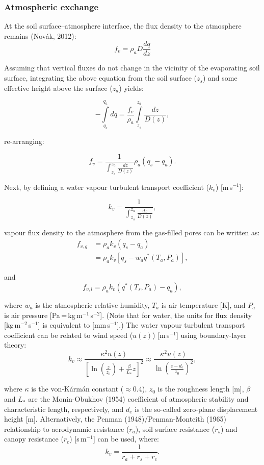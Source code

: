 \documentclass[10pt, letterpapr]{article}
\begin{document}
\subsubsection*{Atmospheric exchange}

At the soil surface--atmosphere interface, the flux density to the atmosphere remains (Nov\'ak, 2012):
\[
	f_v=\rho_a D \frac{dq}{dz}
\]

Assuming that vertical fluxes do not change in the vicinity of the evaporating soil surface, integrating the above equation from the soil surface ($z_s$) and some effective height above the surface ($z_a$) yields: %

\[
	-\int\limits_{q_s}^{q_a}dq = \frac{f_v}{\rho_a}\int\limits_{z_s}^{z_a}\frac{dz}{D(z)},
\]

\noindent re-arranging:

\[
	f_v=\frac{1}{\int_{z_s}^{z_a}\frac{dz}{D(z)}}\rho_a(q_s-q_a).
\]

\noindent Next, by defining a water vapour turbulent transport coefficient ($k_v$) [m\,s$^{-1}$]:

\[
	k_v=\frac{1}{\int_{z_s}^{z_a}\frac{dz}{D(z)}},
\]

\noindent vapour flux density to the atmosphere from the gas-filled pores can be written as:
\begin{align*}
	f_{v,g} &=\rho_ak_v(q_s-q_a) \\
	&=\rho_ak_v\left[q_s-w_aq^*(T_a,P_a)\right],
\end{align*}

\noindent and
\[
	f_{v,l}=\rho_ak_v(q^*(T_s,P_a)-q_a),
\]

\noindent where $w_a$ is the atmospheric relative humidity, $T_a$ is air temperature [K], and $P_a$ is air pressure [Pa\,=\,kg\,m$^{-1}$\,s$^{-2}$]. (Note that for water, the units for flux density [kg\,m$^{-2}$\,s$^{-1}$] is equivalent to [mm\,s$^{-1}$].) The water vapour turbulent transport coefficient can be related to wind speed ($u(z)$) [m\,s$^{-1}$] using boundary-layer theory: %
\[
	k_v\approx\frac{\kappa^2u(z)}{\left[\ln\left(\frac{z}{z_0}\right)+\frac{\beta}{L_*}z\right]^2} \approx\frac{\kappa^2u(z)}{\ln\left(\frac{z-d_e}{z_0}\right)^2},
\]

\noindent where $\kappa$ is the von-K\'arm\'an constant ($\approx0.4$), $z_0$ is the roughness length [m], $\beta$ and $L_*$ are the Monin-Obukhov (1954) coefficient of atmospheric stability and characteristic length, respectively, and $d_e$ is the so-called zero-plane displacement height [m]. Alternatively, the Penman (1948)/Penman-Monteith (1965) relationship to aerodynamic resistance ($r_a$), soil surface resistance ($r_s$) and canopy resistance ($r_c$) [s\,m$^{-1}$] can be used, where:
\[
	k_v=\frac{1}{r_a+r_s+r_c}.
\]
\end{document}
